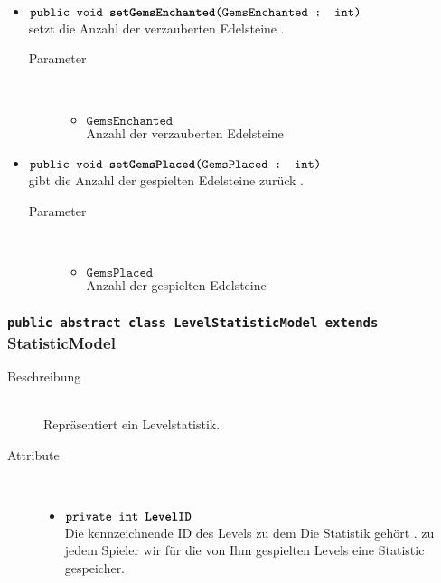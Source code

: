 \begin{description}
\begin{itemize}
					\item $\texttt{public  void \textbf{setGemsEnchanted}(GemsEnchanted : int)}$ \\ setzt die Anzahl der verzauberten Edelsteine  .
				\begin{description}
				\item[Parameter] \hfill \\
					\vspace{-.8cm}
					\begin{itemize}
						\item $\texttt{GemsEnchanted }$ \\Anzahl der verzauberten Edelsteine
					\end{itemize}	
					\end{description}
					\item $\texttt{public  void \textbf{setGemsPlaced}(GemsPlaced : int)}$ \\ gibt die Anzahl der gespielten Edelsteine zurück .
				\begin{description}
				\item[Parameter] \hfill \\
					\vspace{-.8cm}
					\begin{itemize}
						\item $\texttt{GemsPlaced }$ \\Anzahl der gespielten Edelsteine
					\end{itemize}	
					\end{description}
			\end{itemize}
		\end{description}
\subsubsection{\normalfont \texttt{public abstract class \textbf{LevelStatisticModel} extends}  StatisticModel} 
\begin{description}
		
		\item[Beschreibung] \hfill \\ Repräsentiert ein Levelstatistik.
		\item[Attribute] \hfill \\
			\vspace{-.8cm}
			\begin{itemize}
				\item $\texttt{private int \textbf{LevelID}}$ \\ Die kennzeichnende ID des Levels zu dem Die Statistik gehört . zu jedem Spieler wir für die von Ihm gespielten Levels eine Statistic gespeicher.				
			\end{itemize}
		\end{description}
				
			